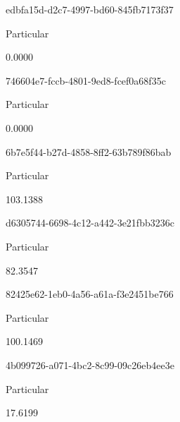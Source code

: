 \documentclass[
  11pt,
  a4paper,
  DIV=11,
  numbers=noendperiod]{scrartcl}
\begin{document}
\n    

\n    

\n      

edbfa15d-d2c7-4997-bd60-845fb7173f37

\n      

Particular

\n      

0.0000

\n    

\n    

\n      

746604e7-fccb-4801-9ed8-fcef0a68f35c

\n      

Particular

\n      

0.0000

\n    

\n    

\n      

6b7e5f44-b27d-4858-8ff2-63b789f86bab

\n      

Particular

\n      

103.1388

\n    

\n    

\n      

d6305744-6698-4c12-a442-3e21fbb3236c

\n      

Particular

\n      

82.3547

\n    

\n    

\n      

82425e62-1eb0-4a56-a61a-f3e2451be766

\n      

Particular

\n      

100.1469

\n    

\n    

\n      

4b099726-a071-4bc2-8c99-09c26eb4ee3e

\n      

Particular

\n      

17.6199

\n    

\n    
\end{document}
